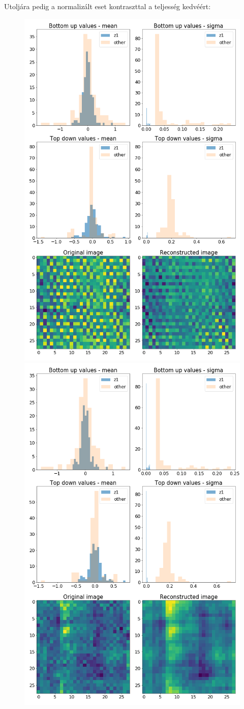 \documentclass[12pt, english]{article}
\begin{document}
\vspace{4mm}

\par Utoljára pedig a normalizált eset kontraszttal a teljesség kedvéért:

\vspace{4mm}

\begin{figure}[H]
  \begin{minipage}{0.5\linewidth}
    \centering
    \includegraphics[width=.6\linewidth]{z1_vis/z1_vis_norm_contrast/16_DenseLinLinLadderVAE_textures_contrastNorm_contrast-stats-1_TD_BU_COMPS_1.png}
  \end{minipage}
  \begin{minipage}{0.5\linewidth}
    \centering
    \includegraphics[width=.6\linewidth]{z1_vis/z1_vis_norm_contrast/16_DenseLinLinLadderVAE_textures_contrastNorm_contrast-stats-2_TD_BU_COMPS_1.png}
  \end{minipage}


\end{figure}
\end{document}
